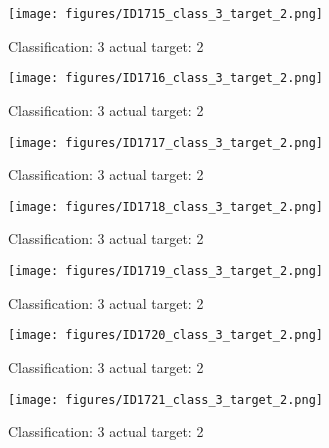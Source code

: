 \begin{figure}[h!]
\begin{center}
\texttt{[image: figures/ID1715\_class\_3\_target\_2.png]}
\end{center}
\caption{ Classification: 3 actual target: 2}
\label{fig:ID1715_class_3_target_2}
\end{figure}
\begin{figure}[h!]
\begin{center}
\texttt{[image: figures/ID1716\_class\_3\_target\_2.png]}
\end{center}
\caption{ Classification: 3 actual target: 2}
\label{fig:ID1716_class_3_target_2}
\end{figure}
\begin{figure}[h!]
\begin{center}
\texttt{[image: figures/ID1717\_class\_3\_target\_2.png]}
\end{center}
\caption{ Classification: 3 actual target: 2}
\label{fig:ID1717_class_3_target_2}
\end{figure}
\begin{figure}[h!]
\begin{center}
\texttt{[image: figures/ID1718\_class\_3\_target\_2.png]}
\end{center}
\caption{ Classification: 3 actual target: 2}
\label{fig:ID1718_class_3_target_2}
\end{figure}
\begin{figure}[h!]
\begin{center}
\texttt{[image: figures/ID1719\_class\_3\_target\_2.png]}
\end{center}
\caption{ Classification: 3 actual target: 2}
\label{fig:ID1719_class_3_target_2}
\end{figure}
\begin{figure}[h!]
\begin{center}
\texttt{[image: figures/ID1720\_class\_3\_target\_2.png]}
\end{center}
\caption{ Classification: 3 actual target: 2}
\label{fig:ID1720_class_3_target_2}
\end{figure}
\begin{figure}[h!]
\begin{center}
\texttt{[image: figures/ID1721\_class\_3\_target\_2.png]}
\end{center}
\caption{ Classification: 3 actual target: 2}
\label{fig:ID1721_class_3_target_2}
\end{figure}
